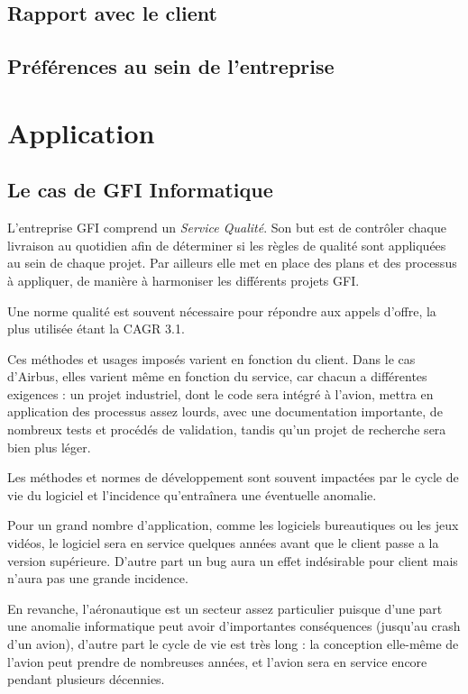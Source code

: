 \subsection{Rapport avec le client}

\subsection{Préférences au sein de l'entreprise}

\section{Application}

\subsection{Le cas de GFI Informatique}

L'entreprise GFI comprend un \textit{Service Qualité}. Son but est de contrôler chaque livraison au quotidien afin de déterminer si les règles de qualité sont appliquées au sein de chaque projet. Par ailleurs elle met en place des plans et des processus à appliquer, de manière à harmoniser les différents projets GFI.

Une norme qualité est souvent nécessaire pour répondre aux appels d'offre, la plus utilisée étant la CAGR 3.1.

Ces méthodes et usages imposés varient en fonction du client. Dans le cas d'Airbus, elles varient même en fonction du service, car chacun a différentes exigences : un projet industriel, dont le code sera intégré à l'avion, mettra en application des processus assez lourds, avec une documentation importante, de nombreux tests et procédés de validation, tandis qu'un projet de recherche sera bien plus léger.

Les méthodes et normes de développement sont souvent impactées par le cycle de vie du logiciel et l'incidence qu'entraînera une éventuelle anomalie.

Pour un grand nombre d'application, comme les logiciels bureautiques ou les jeux vidéos, le logiciel sera en service quelques années avant que le client passe a la version supérieure. D'autre part un bug aura un effet indésirable pour client mais n'aura pas une grande incidence.

En revanche, l'aéronautique est un secteur assez particulier puisque d'une part une anomalie informatique peut avoir d'importantes conséquences (jusqu'au crash d'un avion), d'autre part le cycle de vie est très long : la conception elle-même de l'avion peut prendre de nombreuses années, et l'avion sera en service encore pendant plusieurs décennies.

